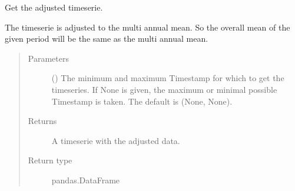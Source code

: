 \documentclass[letterpaper,10pt,english]{sphinxmanual}
\begin{document}
\begin{fulllineitems}
\begin{fulllineitems}
\end{fulllineitems}


\begin{fulllineitems}
\label{\detokenize{weatherDB:weatherDB.station.StationBase.get_adj}}
\sphinxAtStartPar
Get the adjusted timeserie.

\sphinxAtStartPar
The timeserie is adjusted to the multi annual mean.
So the overall mean of the given period will be the same as the multi annual mean.
\begin{quote}\begin{description}
\item[{Parameters}] \leavevmode
\sphinxAtStartPar
{} ({\hyperref[\detokenize{weatherDB.lib:weatherDB.lib.utils.TimestampPeriod}]{}}\sphinxstyleliteralemphasis{\sphinxupquote{(}}\sphinxstyleliteralemphasis{\sphinxupquote{)}}\sphinxstyleliteralemphasis{\sphinxupquote{, }}) \textendash{} The minimum and maximum Timestamp for which to get the timeseries.
If None is given, the maximum or minimal possible Timestamp is taken.
The default is (None, None).

\item[{Returns}] \leavevmode
\sphinxAtStartPar
A timeserie with the adjusted data.

\item[{Return type}] \leavevmode
\sphinxAtStartPar
pandas.DataFrame

\end{description}\end{quote}

\end{fulllineitems}



\end{fulllineitems}
\end{document}
